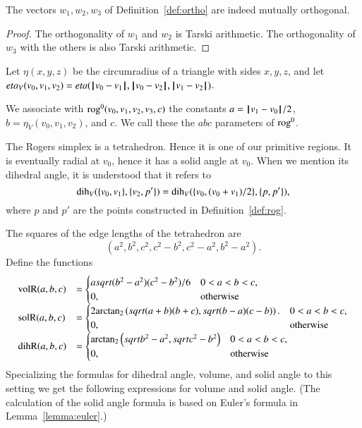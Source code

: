 \begin{lemma} The vectors $w_1,w_2,w_3$ of Definition~\ref{def:ortho}
are indeed mutually orthogonal.
\end{lemma}

\begin{proof} The orthogonality of $w_1$ and $w_2$ is 
Tarski arithmetic. %
The orthogonality of $w_3$ with the others is also Tarski arithmetic. %
\end{proof}

\begin{definition}\label{def:etaV}
Let $\eta(x,y,z)$ be the circumradius of a triangle with sides
$x,y,z$, and let $eta_V(v_0,v_1,v_2) = eta({\hskip0.1em|\hskip-0.15em|\hskip0.1em}v_0 - v_1{\hskip0.1em|\hskip-0.15em|\hskip0.1em},{\hskip0.1em|\hskip-0.15em|\hskip0.1em}v_0 - v_2{\hskip0.1em|\hskip-0.15em|\hskip0.1em},{\hskip0.1em|\hskip-0.15em|\hskip0.1em}v_1 - v_2{\hskip0.1em|\hskip-0.15em|\hskip0.1em})$.
\end{definition}

\begin{definition}
We associate with ${\operatorname{rog}}^0(v_0,v_1,v_2,v_3,c)$ the constants
$a={\hskip0.1em|\hskip-0.15em|\hskip0.1em}v_1 - v_0{\hskip0.1em|\hskip-0.15em|\hskip0.1em}/2$, $b=\eta_V(v_0,v_1,v_2)$, and $c$.
We call these the $abc$ parameters of ${\operatorname{rog}}^0$.
\end{definition}

The Rogers simplex is a tetrahedron.  Hence it is one of our
primitive regions.  It is eventually radial at $v_0$, hence
it has a solid angle at $v_0$.  When we mention its dihedral
angle, it is understood that it refers to 
   $$
   \operatorname{dih}_V(\{v_0,v_1\},\{v_2,p'\})=\operatorname{dih}_V(\{v_0,(v_0+v_1)/2\},\{p,p'\}),
   $$
where $p$ and $p'$ are the points 
constructed in Definition~\ref{def:rog}.

The squares of the edge lengths of the tetrahedron are
   $$
   (a^2,b^2,c^2,c^2-b^2,c^2-a^2,b^2-a^2).
   $$
Define the functions
   $$
   \begin{array}{lll}
     {\operatorname{volR}}(a,b,c) &= \begin{cases}
       asqrt{(b^2-a^2)(c^2-b^2)}/6& 0 < a < b < c,\\
       0,&\text{otherwise}
       \end{cases}\\
     {\operatorname{solR}}(a,b,c) &= \begin{cases}
      2 {\operatorname{arctan_2}}\left(sqrt{{(a+b)(b+c)}},
         sqrt{{(b-a) (c-b)}}\right).& 0 < a < b < c,\\
      0,&\text{otherwise}
     \end{cases}\\
     {\operatorname{dihR}}(a,b,c) &= \begin{cases}
      {\operatorname{arctan\ensuremath{_2}}}\left(sqrt{b^2 - a^2},sqrt{c^2 - b^2}\right)
      & 0 < a < b < c,\\
      0,&\text{otherwise}
     \end{cases}
     \end{array}
   $$
Specializing the formulas for dihedral angle, volume, and solid angle to this
setting we get the following expressions for volume and solid angle.
(The calculation of the
 solid angle formula is based on Euler's formula in 
Lemma~\ref{lemma:euler}.)

